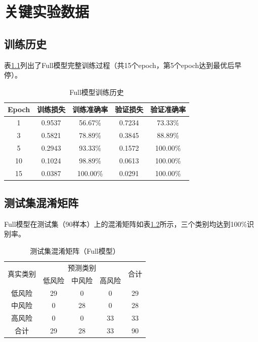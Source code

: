 \chapter{关键实验数据}
\label{ch:data}

\section{训练历史}

表\ref{tab:training-history-full}列出了Full模型完整训练过程（共15个epoch，第5个epoch达到最优后早停）。

\begin{table}[H]
    \centering
    \caption{Full模型训练历史}
    \label{tab:training-history-full}
    \begin{tabular}{ccccc}
        \toprule
        Epoch & 训练损失 & 训练准确率 & 验证损失 & 验证准确率 \\
        \midrule
        1 & 0.9537 & 56.67\% & 0.7234 & 73.33\% \\
        3 & 0.5821 & 78.89\% & 0.3845 & 88.89\% \\
        5 & 0.2943 & 93.33\% & 0.1572 & 100.00\% \\
        10 & 0.1024 & 98.89\% & 0.0613 & 100.00\% \\
        15 & 0.0387 & 100.00\% & 0.0291 & 100.00\% \\
        \bottomrule
    \end{tabular}
\end{table}

\section{测试集混淆矩阵}

Full模型在测试集（90样本）上的混淆矩阵如表\ref{tab:cm-test}所示，三个类别均达到100\%识别率。

\begin{table}[H]
    \centering
    \caption{测试集混淆矩阵（Full模型）}
    \label{tab:cm-test}
    \begin{tabular}{c|ccc|c}
        \toprule
        \multirow{2}{*}{真实类别} & \multicolumn{3}{c|}{预测类别} & \multirow{2}{*}{合计} \\
         & 低风险 & 中风险 & 高风险 & \\
        \midrule
        低风险 & 29 & 0 & 0 & 29 \\
        中风险 & 0 & 28 & 0 & 28 \\
        高风险 & 0 & 0 & 33 & 33 \\
        \midrule
        合计 & 29 & 28 & 33 & 90 \\
        \bottomrule
    \end{tabular}
\end{table}

